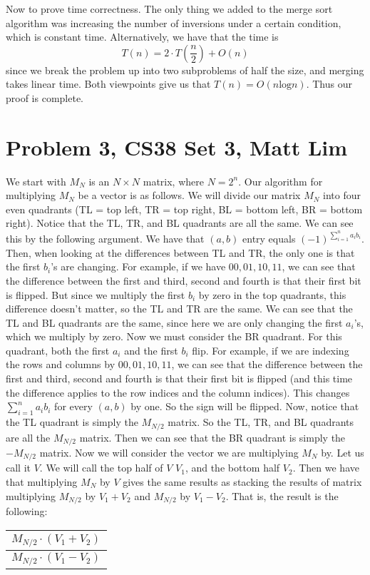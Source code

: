\documentclass{article}
\begin{document}
Now to prove time correctness. The only thing we added to the merge sort
algorithm was increasing the number of inversions under a certain condition,
which is constant time. Alternatively, we have that the time is
\[ T(n) = 2 \cdot T(\frac{n}{2}) + O(n) \]
since we break the problem up into two subproblems of half the size, and merging
takes linear time.
Both viewpoints give us that $T(n) = O(n\text{log}n)$. Thus our proof is
complete.
\newpage

\section*{Problem 3, CS38 Set 3, Matt Lim}
We start with $M_N$ is an $N \times N$ matrix, where $N = 2^n$. Our algorithm for
multiplying $M_N$ be a vector is as follows. We will divide our matrix $M_N$ into
four even quadrants (TL = top left, TR = top right, BL = bottom left, BR =
bottom right). Notice that the TL, TR, and BL quadrants are all the same. We can
see this by the following argument. We have that $(a,b)$ entry equals
$(-1)^{\sum_{i=1}^n a_ib_i}$. Then, when looking at the differences between
TL and TR, the only one is that the first $b_i$'s are changing. For example,
if we have $00, 01, 10, 11$, we can see that the difference between the first
and third, second and fourth is that their first bit is flipped. But since we
multiply the first $b_i$ by zero in the top quadrants, this difference doesn't
matter, so the TL and TR are the same. We can see that the TL and BL quadrants
are the same, since here we are only changing the first $a_i$'s, which we
multiply by zero. Now we must consider the BR quadrant. For this quadrant, both
the first $a_i$ and the first $b_i$ flip. For example, if we are indexing
the rows and columns by $00, 01, 10, 11$, we can see that the difference between
the first and third, second and fourth is that their first bit is flipped (and
this time the difference applies to the row indices and the column indices).
This changes $\sum_{i=1}^n a_ib_i$ for
every $(a,b)$ by one. So the sign will be flipped.
Now, notice that the TL quadrant is simply the $M_{N/2}$ matrix. So the TL, TR, and
BL quadrants are all the $M_{N/2}$ matrix. Then we can see that the BR quadrant
is simply the $-M_{N/2}$ matrix. Now we will consider the vector we are
multiplying $M_N$ by. Let us call it $V$. We will call the top half of $V$
$V_1$, and the bottom half $V_2$. Then we have that multiplying $M_N$ by $V$
gives the same results as stacking the results of matrix multiplying $M_{N/2}$ by $V_1
+ V_2$ and $M_{N/2}$ by $V_1 - V_2$. That is, the result is the following:
\begin{center}
  \begin{tabular}{ | l | }
    \hline
    $M_{N/2} \cdot (V_1 + V_2)$  \\ \hline
    $M_{N/2} \cdot (V_1 - V_2)$ \\ \hline
  \end{tabular}
\end{center}
\end{document}
